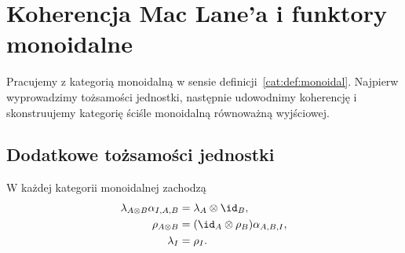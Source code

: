 \section{Koherencja Mac Lane'a i funktory monoidalne}\label{cat:sec:coherence}

Pracujemy z kategorią monoidalną w sensie definicji~\ref{cat:def:monoidal}. Najpierw wyprowadzimy tożsamości jednostki, następnie udowodnimy koherencję i skonstruujemy kategorię ściśle monoidalną równoważną wyjściowej.

\subsection{Dodatkowe tożsamości jednostki}
\begin{lemat}\label{cat:lem:unit-coherence}
W każdej kategorii monoidalnej zachodzą
\begin{align}
\lambda_{A\otimes B}\alpha_{I,A,B}&=\lambda_A\otimes\id_B,\label{cat:eq:left-unit-coherence}\\
\rho_{A\otimes B}&=(\id_A\otimes\rho_B)\alpha_{A,B,I},\label{cat:eq:right-unit-coherence}\\
\lambda_I&=\rho_I.\label{cat:eq:unitors-equal}
\end{align}
\end{lemat}
